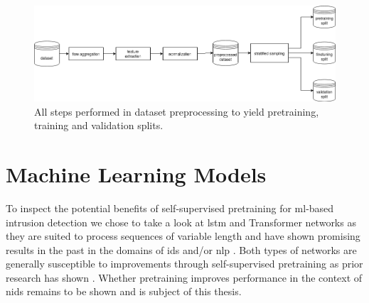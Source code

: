 \begin{figure}[h]
	\centering
	\includegraphics[width=0.95\linewidth]{graphics/img/dataset_preprocessing.png}
	\caption{All steps performed in dataset preprocessing to yield pretraining, training and validation splits.}
	\label{fig:dataset_preprocessing}
\end{figure}

\section{Machine Learning Models}

To inspect the potential benefits of self-supervised pretraining for \gls{ml}-based intrusion detection we chose to take a look at \gls{lstm} and Transformer networks as they are suited to process sequences of variable length and have shown promising results in the past in the domains of \gls{ids} and/or \gls{nlp} . Both types of networks are generally susceptible to improvements through self-supervised pretraining as prior research has shown \cite{bert} \cite{unsupervised_learning_lstms} \cite{unsupervised_learning_lstms_timeseries}. Whether pretraining improves performance in the context of \gls{nids} remains to be shown and is subject of this thesis.

